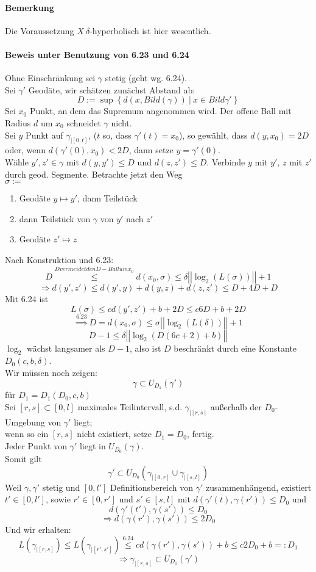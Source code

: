 \documentclass{article}
\newcommand{\set}[2]{\left\lbrace #1~|~#2 \right\rbrace}
\newcommand{\norm}[1]{\left|\left|#1\right|\right|}
\begin{document}
\paragraph{Bemerkung} Die Voraussetzung $X ~\delta$-hyperbolisch ist hier wesentlich.

\paragraph{Beweis unter Benutzung von 6.23 und 6.24}
Ohne Einschränkung sei $\gamma$ stetig (geht wg. 6.24).\\
Sei $\gamma'$ Geodäte, wir schätzen zunächst Abstand ab:
\[D:= \sup\set{d(x, Bild(\gamma))}{ x\in Bild\gamma' } \]
Sei $x_0$ Punkt, an dem das Supremum angenommen wird. Der offene Ball mit Radius $d$ um $x_0$ schneidet $\gamma$ nicht.\\
Sei $y$ Punkt auf $\gamma_{|[0,t]}$, ($t$ so, dass $\gamma'(t) = x_0$), so gewählt, dass $d(y,x_0) = 2D$ oder, wenn $d(\gamma'(0), x_0)< 2D$, dann setze $y = \gamma'(0)$.\\
Wähle $y',z' \in \gamma$ mit $d(y,y') \leq D$ und $d(z,z') \leq D$. Verbinde $y$ mit $y'$, $z$ mit $z'$ durch geod. Segmente. Betrachte jetzt den Weg\\
$\sigma := $
\begin{enumerate}
	\item Geodäte $y\mapsto y'$, dann Teilstück  
	\item dann Teilstück von $\gamma$ von $y'$ nach $z'$
	\item Geodäte $z'\mapsto z$
\end{enumerate}
Nach Konstruktion und 6.23:
\[D \overset{D vermeidet den D-Ball um x_0 }{\leq} d(x_0, \sigma) \leq \delta \norm{\log_2(L(\sigma))} + 1 \]
\[\Longrightarrow d(y',z') \leq d(y',y) + d(y,z) + d(z,z') \leq D + 4D+ D \]
Mit 6.24 ist
\[L(\sigma) \leq cd(y',z') + b + 2D \leq c6D + b +2D\]
\[\overset{6.23}{\Longrightarrow} D = d(x_0, \sigma) \leq \sigma \norm{\log_2(L(\delta))} + 1 \]
\[ D- 1 \leq \delta \norm{\log_2(D(6c + 2) + b)} \]
$\log_2$ wächst langsamer als $D-1$, also ist $D$ beschränkt durch eine Konstante $D_0(c,b,\delta)$.\\
Wir müssen noch zeigen: 
\[\gamma \subset U_{D_1}(\gamma') \]
für $D_1 = D_1(D_0, c,b)$\\
Sei $[r,s] \subset [0,l]$ maximales Teilintervall, s.d. $\gamma_{|[r,s]}$ außerhalb der $D_0$-Umgebung von $\gamma'$ liegt;\\
wenn so ein $[r,s]$ nicht existiert, setze $D_1 = D_0$, fertig.\\
Jeder Punkt von $\gamma'$ liegt in $U_{D_0} (\gamma)$.\\
Somit gilt
\[ \gamma' \subset U_{D_0}(\gamma_{|[0,r]} \cup \gamma_{|[s,l]}) \]
Weil $\gamma, \gamma'$ stetig und $[0,l']$ Definitionsbereich von $\gamma'$ zusammenhängend, existiert $t'\in [0,l']$, sowie $r'\in [0,r']$ und $s' \in [s,l]$ mit $d(\gamma'(t), \gamma(r')) \leq D_0$ und
\[ d(\gamma'(t'), \gamma(s')) \leq D_0 \]
\[\Longrightarrow d(\gamma(r'), \gamma(s')) \leq 2D_0 \]
Und wir erhalten: 
\[ L(\gamma_{|[r,s]}) \leq L(\gamma_{|[r',s']}) \overset{6.24}{\leq} cd(\gamma(r'), \gamma(s')) + b \leq c2D_0 + b=:D_1 \]
\[\Longrightarrow \gamma_{|[r,s]} \subset U_{D_1}(\gamma')  \]
\end{document}

